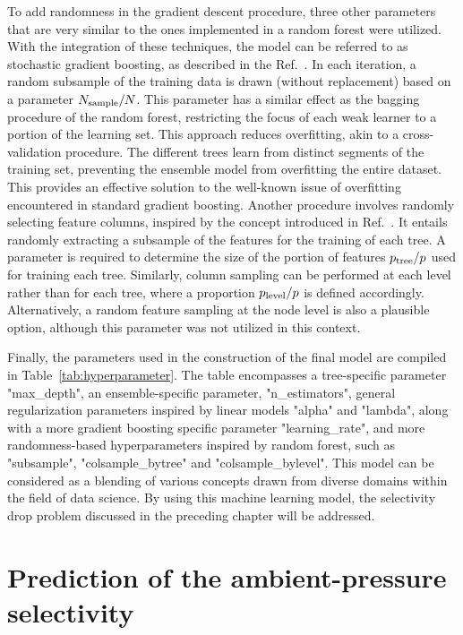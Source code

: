 \documentclass[main]{subfiles}
\begin{document}
To add randomness in the gradient descent procedure, three other parameters that are very similar to the ones implemented in a random forest were utilized. With the integration of these techniques, the model can be referred to as stochastic gradient boosting, as described in the Ref.~\cite{Friedman2002}. In each iteration, a random subsample of the training data is drawn (without replacement) based on a parameter $N_{\text{sample}}/N$. This parameter has a similar effect as the bagging procedure of the random forest, restricting the focus of each weak learner to a portion of the learning set. This approach reduces overfitting, akin to a cross-validation procedure. The different trees learn from distinct segments of the training set, preventing the ensemble model from overfitting the entire dataset. This provides an effective solution to the well-known issue of overfitting encountered in standard gradient boosting. Another procedure involves randomly selecting feature columns, inspired by the concept introduced in Ref.~\cite{Tin_Kam_Ho_1998}. It entails randomly extracting a subsample of the features for the training of each tree. A parameter is required to determine the size of the portion of features  $p_{\text{tree}}/p$ used for training each tree. Similarly, column sampling can be performed at each level rather than for each tree, where a proportion $p_{\text{level}}/p$ is defined accordingly. Alternatively, a random feature sampling at the node level is also a plausible option, although this parameter was not utilized in this context.

Finally, the parameters used in the construction of the final model are compiled in Table~\ref{tab:hyperparameter}. The table encompasses a tree-specific parameter "max\_depth", an ensemble-specific parameter, "n\_estimators", general regularization parameters inspired by linear models "alpha" and "lambda", along with a more gradient boosting specific parameter "learning\_rate", and more randomness-based hyperparameters inspired by random forest, such as "subsample", "colsample\_bytree" and "colsample\_bylevel". This model can be considered as a blending of various concepts drawn from diverse domains within the field of data science. By using this machine learning model, the selectivity drop problem discussed in the preceding chapter will be addressed.

\section{Prediction of the ambient-pressure selectivity}
\end{document}
